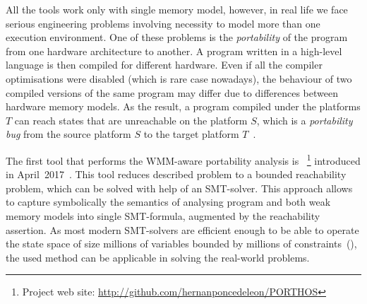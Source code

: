 All the  tools work only with single memory model, however, in real life we face serious engineering problems involving necessity to model more than one execution environment. One of these problems is the \textit{portability} of the program from one hardware architecture to another. A program written in a high-level language is then compiled for different hardware. Even if all the compiler optimisations were disabled (which is rare case nowadays), the behaviour of two compiled versions of the same program may differ due to differences between hardware memory models.
As the result, a program compiled under the platforms $T$ can reach states that are unreachable on the platform $S$, which is a \textit{portability bug} from the source platform $S$ to the target platform $T$~\cite{Porthos17}.

The first tool that performs the WMM-aware portability analysis is \porthos~\footnote{Project web site: \url{http://github.com/hernanponcedeleon/PORTHOS}} introduced in April~2017~\cite{Porthos17}. This tool reduces described problem to a bounded reachability problem, which can be solved with help of an SMT-solver. This approach allows to capture symbolically the semantics of analysing program and both weak memory models into single SMT-formula, augmented by the reachability assertion. As most modern SMT-solvers are efficient enough to be able to operate the state space of size millions of variables bounded by millions of constraints~(\cite{malik2009boolean}), the used method can be applicable in solving the real-world problems.



